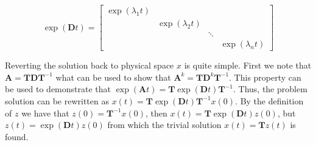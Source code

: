 \begin{equation}
\exp(\mathbf{D}t)=
\begin{bmatrix}
	\exp(\lambda_{1}t) & & & \\
	& \exp(\lambda_{2}t) & & \\ 
	& & \ddots & \\
	& & & \exp(\lambda_{n}t)
\end{bmatrix}
\end{equation}

Reverting the solution back to physical space $x$ is quite simple. First we note that $\mathbf{A}=\mathbf{T}\mathbf{D}\mathbf{T}^{-1}$ what can be used to show that $\mathbf{A}^{k}=\mathbf{T}\mathbf{D}^{k}\mathbf{T}^{-1}$. This property can be used to demonstrate that $\exp(\mathbf{A}t)=\mathbf{T}\exp(\mathbf{D}t)\mathbf{T}^{-1}$. Thus, the problem solution can be rewritten as $x(t)=\mathbf{T}\exp(\mathbf{D}t)\mathbf{T}^{-1}x(0)$. By the definition of $z$ we have that $z(0)=\mathbf{T}^{-1}x(0)$, then $x(t)=\mathbf{T}\exp(\mathbf{D}t)z(0)$, but $z(t)=\exp(\mathbf{D}t)z(0)$ from which the trivial solution $x(t)=\mathbf{T}z(t)$ is found.

\endinput